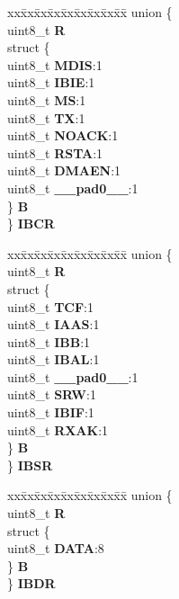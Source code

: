 \begin{DoxyCompactItemize}
\begin{tabbing}
\end{tabbing}\item 
\mbox{\label{structI2C__tag_afbd808a19f5d1c275ed7151c8ff38f64}} 
\begin{tabbing}
xx\=xx\=xx\=xx\=xx\=xx\=xx\=xx\=xx\=\kill
union \{\\
\>uint8\_t {\bfseries R}\\
\>struct \{\\
\>\>uint8\_t {\bfseries MDIS}:1\\
\>\>uint8\_t {\bfseries IBIE}:1\\
\>\>uint8\_t {\bfseries MS}:1\\
\>\>uint8\_t {\bfseries TX}:1\\
\>\>uint8\_t {\bfseries NOACK}:1\\
\>\>uint8\_t {\bfseries RSTA}:1\\
\>\>uint8\_t {\bfseries DMAEN}:1\\
\>\>uint8\_t {\bfseries \_\_pad0\_\_}:1\\
\>\} {\bfseries B}\\
\} {\bfseries IBCR}\\

\end{tabbing}\item 
\mbox{\label{structI2C__tag_a1b82868beb28eaec36c872d75c6f6a9e}} 
\begin{tabbing}
xx\=xx\=xx\=xx\=xx\=xx\=xx\=xx\=xx\=\kill
union \{\\
\>uint8\_t {\bfseries R}\\
\>struct \{\\
\>\>uint8\_t {\bfseries TCF}:1\\
\>\>uint8\_t {\bfseries IAAS}:1\\
\>\>uint8\_t {\bfseries IBB}:1\\
\>\>uint8\_t {\bfseries IBAL}:1\\
\>\>uint8\_t {\bfseries \_\_pad0\_\_}:1\\
\>\>uint8\_t {\bfseries SRW}:1\\
\>\>uint8\_t {\bfseries IBIF}:1\\
\>\>uint8\_t {\bfseries RXAK}:1\\
\>\} {\bfseries B}\\
\} {\bfseries IBSR}\\

\end{tabbing}\item 
\mbox{\label{structI2C__tag_aa7becdc835fbf5f70d5a979ccaf932c7}} 
\begin{tabbing}
xx\=xx\=xx\=xx\=xx\=xx\=xx\=xx\=xx\=\kill
union \{\\
\>uint8\_t {\bfseries R}\\
\>struct \{\\
\>\>uint8\_t {\bfseries DATA}:8\\
\>\} {\bfseries B}\\
\} {\bfseries IBDR}\\


\end{tabbing}
\end{DoxyCompactItemize}
